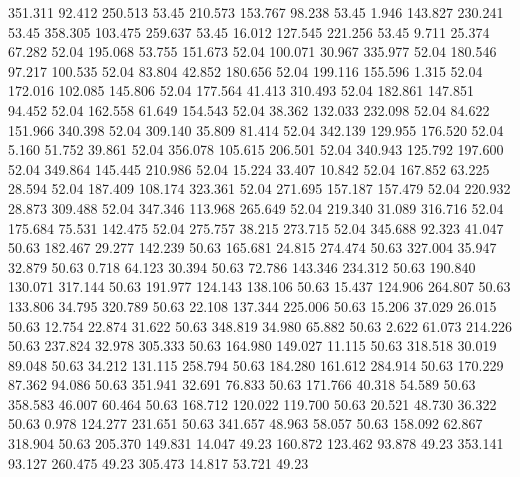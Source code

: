  351.311   92.412  250.513        53.45
 210.573  153.767   98.238        53.45
   1.946  143.827  230.241        53.45
 358.305  103.475  259.637        53.45
  16.012  127.545  221.256        53.45
   9.711   25.374   67.282        52.04
 195.068   53.755  151.673        52.04
 100.071   30.967  335.977        52.04
 180.546   97.217  100.535        52.04
  83.804   42.852  180.656        52.04
 199.116  155.596    1.315        52.04
 172.016  102.085  145.806        52.04
 177.564   41.413  310.493        52.04
 182.861  147.851   94.452        52.04
 162.558   61.649  154.543        52.04
  38.362  132.033  232.098        52.04
  84.622  151.966  340.398        52.04
 309.140   35.809   81.414        52.04
 342.139  129.955  176.520        52.04
   5.160   51.752   39.861        52.04
 356.078  105.615  206.501        52.04
 340.943  125.792  197.600        52.04
 349.864  145.445  210.986        52.04
  15.224   33.407   10.842        52.04
 167.852   63.225   28.594        52.04
 187.409  108.174  323.361        52.04
 271.695  157.187  157.479        52.04
 220.932   28.873  309.488        52.04
 347.346  113.968  265.649        52.04
 219.340   31.089  316.716        52.04
 175.684   75.531  142.475        52.04
 275.757   38.215  273.715        52.04
 345.688   92.323   41.047        50.63
 182.467   29.277  142.239        50.63
 165.681   24.815  274.474        50.63
 327.004   35.947   32.879        50.63
   0.718   64.123   30.394        50.63
  72.786  143.346  234.312        50.63
 190.840  130.071  317.144        50.63
 191.977  124.143  138.106        50.63
  15.437  124.906  264.807        50.63
 133.806   34.795  320.789        50.63
  22.108  137.344  225.006        50.63
  15.206   37.029   26.015        50.63
  12.754   22.874   31.622        50.63
 348.819   34.980   65.882        50.63
   2.622   61.073  214.226        50.63
 237.824   32.978  305.333        50.63
 164.980  149.027   11.115        50.63
 318.518   30.019   89.048        50.63
  34.212  131.115  258.794        50.63
 184.280  161.612  284.914        50.63
 170.229   87.362   94.086        50.63
 351.941   32.691   76.833        50.63
 171.766   40.318   54.589        50.63
 358.583   46.007   60.464        50.63
 168.712  120.022  119.700        50.63
  20.521   48.730   36.322        50.63
   0.978  124.277  231.651        50.63
 341.657   48.963   58.057        50.63
 158.092   62.867  318.904        50.63
 205.370  149.831   14.047        49.23
 160.872  123.462   93.878        49.23
 353.141   93.127  260.475        49.23
 305.473   14.817   53.721        49.23
